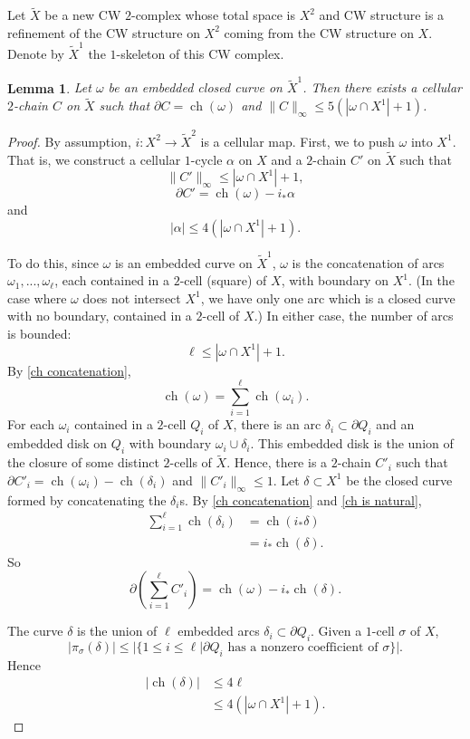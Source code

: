 \documentclass[12pt]{amsart}
\DeclareMathOperator*{\ch}{ch}
\newtheorem{lemma}[theorem]{Lemma}
\theoremstyle{definition}
\begin{document}
Let $\widetilde{X}$ be a new CW $2$-complex whose total space is $X^2$ and CW structure is a refinement of the CW structure on $X^2$ coming from the CW structure on $X$. Denote by $\widetilde{X}^1$ the $1$-skeleton of this CW complex.

\begin{lemma}\label{isoperimetric inequality on X^2} Let $\omega$ be an embedded closed curve on $\widetilde{X}^1$. Then there exists a cellular $2$-chain $C$ on $\widetilde{X}$ such that $\partial C=\ch(\omega)$ and $\|C\|_\infty\leq 5(|\omega\cap X^1|+1)$.
\end{lemma}

\begin{proof} By assumption, $i:X^2\to \widetilde{X}^2$ is a cellular map. First, we to push $\omega$ into $X^1$. That is, we construct a cellular $1$-cycle $\alpha$ on $X$ and a $2$-chain $C'$ on $\widetilde{X}$ such that $$\|C'\|_\infty\leq |\omega\cap X^1|+1,$$ $$\partial C'=\ch(\omega)-i_*\alpha$$ and $$|\alpha|\leq 4(|\omega\cap X^1|+1).$$ 

To do this, since $\omega$ is an embedded curve on $\widetilde{X}^1$, $\omega$ is the concatenation of arcs $\omega_1,...,\omega_\ell$, each contained in a $2$-cell (square) of $X$, with boundary on $X^1$. (In the case where $\omega$ does not intersect $X^1$, we have only one arc which is a closed curve with no boundary, contained in a $2$-cell of $X$.) In either case, the number of arcs is bounded: $$\ell\leq |\omega\cap X^1|+1.$$ By \cref{ch concatenation}, $$\ch(\omega)=\sum_{i=1}^{\ell}{\ch(\omega_i)}.$$ For each $\omega_i$ contained in a $2$-cell $Q_i$ of $X$, there is an arc $\delta_i\subset \partial Q_i$ and an embedded disk on $Q_i$ with boundary $\omega_i\cup \delta_i$. This embedded disk is the union of the closure of some distinct $2$-cells of $\widetilde{X}$. Hence, there is a $2$-chain $C'_i$ such that $\partial C'_i=\ch(\omega_i)-\ch(\delta_i)$ and $\|C'_i\|_\infty\leq 1$. Let $\delta\subset X^1$ be the closed curve formed by concatenating the $\delta_i$s. By \cref{ch concatenation} and \cref{ch is natural}, \begin{align*}\sum_{i=1}^{\ell}\ch(\delta_i)&=\ch(i_*\delta)\\&=i_*\ch(\delta).
\end{align*} So $$\partial \left(\sum_{i=1}^{\ell} C'_i\right)=\ch(\omega)-i_*\ch(\delta).$$

The curve $\delta$ is the union of $\ell$ embedded arcs $\delta_i\subset \partial Q_i$. Given a $1$-cell $\sigma$ of $X$, $$|\pi_\sigma(\delta)|\leq |\{1\leq i\leq \ell|\partial Q_i \text { has a nonzero coefficient of }\sigma\}|.$$ Hence 
\begin{align*}|\ch(\delta)|&\leq 4\ell\\&\leq 4(|\omega\cap X^1|+1).
\end{align*}


\end{proof}
\end{document}
